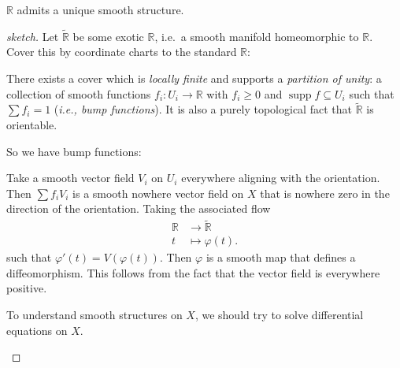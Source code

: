 \begin{claim}

\({\mathbb{R}}\) admits a unique smooth structure.

\end{claim}

\begin{proof}[sketch]

Let \(\tilde {\mathbb{R}}\) be some exotic \({\mathbb{R}}\), i.e.~a
smooth manifold homeomorphic to \({\mathbb{R}}\). Cover this by
coordinate charts to the standard \({\mathbb{R}}\):

\begin{figure}
\centering
{}
\end{figure}

\begin{fact}

There exists a cover which is \emph{locally finite} and supports a
\emph{partition of unity}: a collection of smooth functions
\(f_i: U_i \to {\mathbb{R}}\) with \(f_i \geq 0\) and
\({\operatorname{supp}}f \subseteq U_i\) such that \(\sum f_i = 1\)
(\emph{i.e., bump functions}). It is also a purely topological fact that
\(\tilde {\mathbb{R}}\) is orientable.

\end{fact}

So we have bump functions:

\begin{figure}
\centering
{}
\end{figure}

Take a smooth vector field \(V_i\) on \(U_i\) everywhere aligning with
the orientation. Then \(\sum f_i V_i\) is a smooth nowhere vector field
on \(X\) that is nowhere zero in the direction of the orientation.
Taking the associated flow
\begin{align*}
{\mathbb{R}}&\to \tilde {\mathbb{R}}\\
t &\mapsto \varphi(t)
.\end{align*}
such that \(\varphi'(t) = V(\varphi(t))\). Then \(\varphi\) is a smooth
map that defines a diffeomorphism. This follows from the fact that the
vector field is everywhere positive.

\begin{slogan}

To understand smooth structures on \(X\), we should try to solve
differential equations on \(X\).

\end{slogan}

\end{proof}


